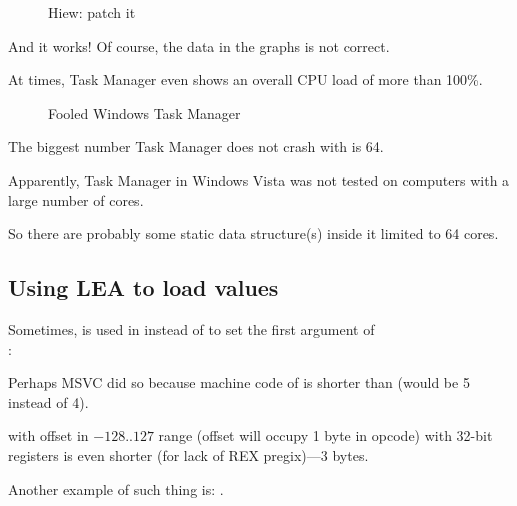 \begin{figure}[H]
\centering
{}
\caption{Hiew: patch it}
\end{figure}

And it works!
Of course, the data in the graphs is not correct.

At times, Task Manager even shows an overall CPU load of more than 100\%.

\begin{figure}[H]
\centering
{}
\caption{Fooled Windows Task Manager}
\end{figure}

The biggest number Task Manager does not crash with is 64.

Apparently, Task Manager in Windows Vista was not tested on computers with a large number of cores.

So there are probably some static data structure(s) inside it limited to 64 cores.

\subsection{Using LEA to load values}
\label{TaskMgr_LEA}

Sometimes,  is used in  instead of  to set the first argument of \\
:




Perhaps \ac{MSVC} did so because machine code of  is shorter than  (would be 5 instead of 4).

 with offset in $-128..127$ range (offset will occupy 1 byte in opcode) with 32-bit registers is even shorter (for lack of REX pregix)---3 bytes.

Another example of such thing is: .
